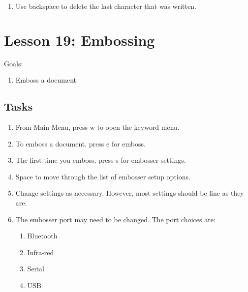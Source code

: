 \documentclass[10pt,letterpaper,twoside]{report}
\begin{document}
{{{{\begin{enumerate}
	\item Use backspace to delete the last character that was written.
\end{enumerate}



\section*{Lesson 19: Embossing}


Goals:



\begin{enumerate}
	\item Emboss a document
\end{enumerate}



 \subsection{Tasks}



\begin{enumerate}
	\item From Main Menu, press w to open the keyword menu.
	      
	\item To emboss a document, press e for emboss.
	      
	\item The first time you emboss, press s for embosser settings.
	      
	\item Space to move through the list of embosser setup options.
	      
	\item Change settings as necessary.  However, most settings should be fine as they are.
	      
	\item The embosser port may need to be changed.  The port choices are:
	      
	      \begin{enumerate}
		      \item Bluetooth
		            
		      \item Infra-red
		            
		      \item  Serial
		            
		      \item USB
		            

\end{enumerate}
\end{enumerate}}}}}
\end{document}
